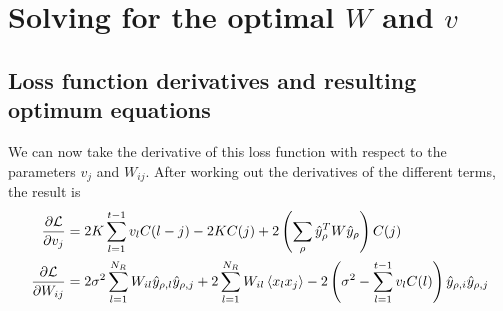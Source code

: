 \documentclass[letter, 12pt]{article}
\begin{document}



\section{Solving for the optimal $W$ and $v$}

\subsection{Loss function derivatives and resulting optimum equations}
We can now take the derivative of this loss function with respect to the parameters $v_j$ and $W_{ij}$. After working out the derivatives of the different terms, the result is
\begin{align*}
\frac{\partial \mathcal{L}}{\partial v_j} &= 2 K \sum_{l=1}^{t-1} v_l C(l-j) - 2 K C(j) + 2 \left(\sum_{\rho} \hat{y}_{\rho}^T W \hat{y}_{\rho} \right) C(j)	\\
\frac{\partial \mathcal{L}}{\partial W_{ij}} &= 2 \sigma^2 \sum_{l=1}^{N_R} W_{il} \hat{y}_{\rho, l} \hat{y}_{\rho, j} + 2 \sum_{l=1}^{N_R} W_{il} \braket{x_l x_j} - 2 \left(\sigma^2 - \sum_{l=1}^{t-1} v_l C(l) \right) \hat{y}_{\rho, i} \hat{y}_{\rho, j}
\end{align*}
\end{document}
